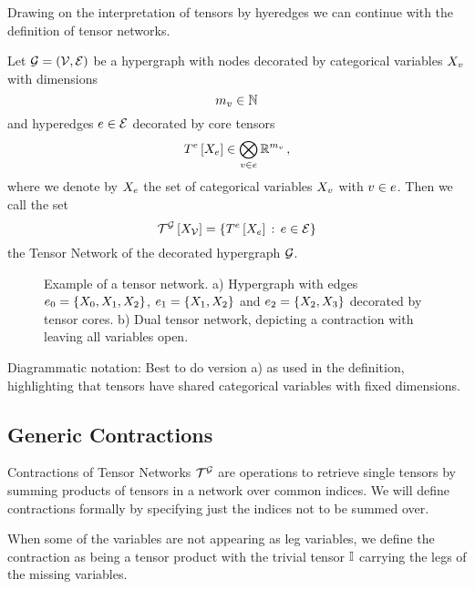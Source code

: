 Drawing on the interpretation of tensors by hyeredges we can continue with the definition of tensor networks.

\begin{definition}\label{def:tensorNetwork}
	Let $\mathcal{G}=(\mathcal{V},\mathcal{E})$ be a hypergraph with nodes decorated by categorical variables $X_{v}$ with dimensions
		\[ m_{v} \in \mathbb{N} \]	
	and hyperedges $e\in\mathcal{E}$ decorated by core tensors
		\[ T^{e}\left[X_{e}\right] \in \bigotimes_{v\in e}\mathbb{R}^{m_{v}} \, , \]
	where we denote by $X_{e}$ the set of categorical variables $X_{v}$ with $v\in e$.
	Then we call the set 
		\[ \mathcal{T}^{\mathcal{G}}\left[X_{\mathcal{V}}\right] = \{T^{e}\left[X_{e}\right]  \, : \, e\in\mathcal{E}\} \]
	the Tensor Network of the decorated hypergraph $\mathcal{G}$.
\end{definition}


\begin{figure}
	\begin{center}
		
	\end{center}
	\caption{
	Example of a tensor network.
	a) Hypergraph with edges $e_0=\{X_{0},X_{1},X_{2}\}$, $e_1=\{X_{1},X_{2}\}$ and $e_2=\{X_{2},X_{3}\}$ decorated by tensor cores.
	b) Dual tensor network, depicting a contraction with leaving all variables open.
	}\label{fig:network}
\end{figure}

Diagrammatic notation: Best to do version a) as used in the definition, highlighting that tensors have shared categorical variables with fixed dimensions.


\subsection{Generic Contractions}


Contractions of Tensor Networks $\mathcal{T}^{\mathcal{G}}$ are operations to retrieve single tensors by summing products of tensors in a network over common indices.
We will define contractions formally by specifying just the indices not to be summed over.


When some of the variables are not appearing as leg variables, we define the contraction as being a tensor product with the trivial tensor $\mathbb{I}$ carrying the legs of the missing variables.


